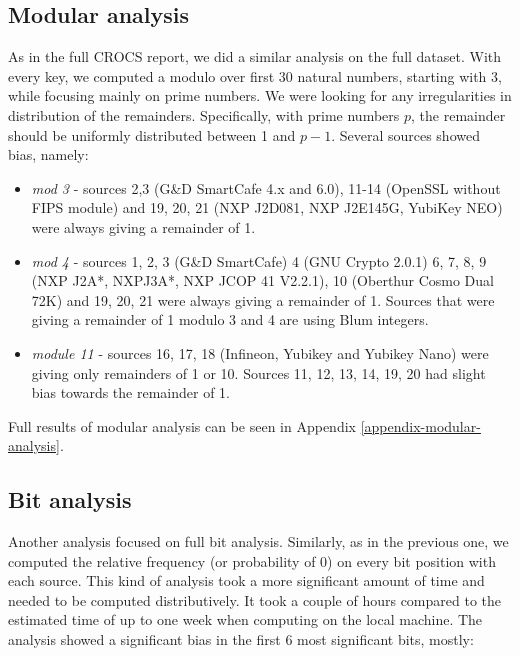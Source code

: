 \subsection{Modular analysis}

As in the full CROCS report\cite{svenda_full}, we did a similar analysis on the full dataset. With every key, we computed a modulo over first 30 natural numbers, starting with 3, while focusing mainly on prime numbers. We were looking for any irregularities in distribution of the remainders. Specifically, with prime numbers $p$, the remainder should be uniformly distributed between 1 and $p-1$. Several sources showed bias, namely:

\begin{itemize}

\item \textit{mod 3} - sources 2,3 (G\&D SmartCafe 4.x and 6.0), 11-14 (OpenSSL without FIPS module) and 19, 20, 21 (NXP J2D081, NXP J2E145G, YubiKey NEO) were always giving a remainder of 1.

\item \textit{mod 4} - sources 1, 2, 3 (G\&D SmartCafe) 4 (GNU Crypto 2.0.1) 6, 7, 8, 9 (NXP J2A*, NXPJ3A*, NXP JCOP 41 V2.2.1), 10 (Oberthur Cosmo Dual 72K) and 19, 20, 21 were always giving a remainder of 1. Sources that were giving a remainder of 1 modulo 3 and 4 are using Blum integers.

\item \textit{module 11} - sources 16, 17, 18 (Infineon, Yubikey and Yubikey Nano) were giving only remainders of 1 or 10. Sources 11, 12, 13, 14, 19, 20 had slight bias towards the remainder of 1.

\end{itemize}

\noindent
Full results of modular analysis can be seen in Appendix \ref{appendix-modular-analysis}.

\subsection{Bit analysis}

Another analysis focused on full bit analysis. Similarly, as in the previous one, we computed the relative frequency (or probability of 0) on every bit position with each source. This kind of analysis took a more significant amount of time and needed to be computed distributively. It took a couple of hours compared to the estimated time of up to one week when computing on the local machine. The analysis showed a significant bias in the first 6 most significant bits, mostly:

